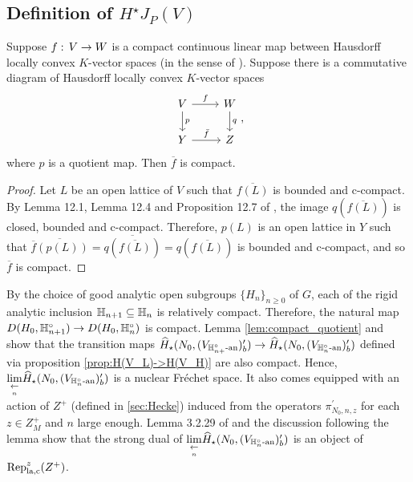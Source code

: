 \documentclass[10pt]{amsart}
\begin{document}
\subsection{Definition of $H^{\star}J_{P}(V)$}\label{sec:def}

\begin{lemma}\label{lem:compact_quotient}
Suppose $f:\,V\rightarrow W$ is a compact continuous linear map between Hausdorff locally convex $K$-vector spaces (in the sense of \cite[]{Schneider_nfs}). Suppose there is a commutative diagram of Hausdorff locally convex $K$-vector spaces \begin{equation*}
    \begin{tikzcd}
	V \arrow[r,"f"] \arrow[d,"p"] & W \arrow[d,"q"] \\
	Y \arrow[r,"\bar{f}"] & Z
    \end{tikzcd},
\end{equation*} where $p$ is a quotient map. Then $\overline{f}$ is compact.
\end{lemma}
\begin{proof}
Let $L$ be an open lattice of $V$ such that $\overline{f(L)}$ is bounded and c-compact. By Lemma 12.1, Lemma 12.4 and Proposition 12.7 of \cite{Schneider_nfs}, the image $q\left(\overline{f(L)}\right)$ is closed, bounded and c-compact. Therefore, $p(L)$ is an open lattice in $Y$ such that $\overline{\overline{f}\left(p(L)\right)} = \overline{q\left(\overline{f(L)}\right)}=q\left(\overline{f(L)}\right)$ is bounded and c-compact, and so $\overline{f}$ is compact.
\end{proof}

By the choice of good analytic open subgroups $\{H_{n}\}_{n\geq0}$ of $G$, each of the rigid analytic inclusion $\mathbb{H}_{n+1}\subseteq \mathbb{H}_{n}$ is relatively compact. Therefore, the natural map $D(H_{0},\mathbb{H}_{n+1}^{\circ})\rightarrow D(H_{0},\mathbb{H}_{n}^{\circ})$ is compact. Lemma \ref{lem:compact_quotient} and \cite[Rem. 16.7]{Schneider_nfs} show that the transition maps $\widehat{H}_{\star}(N_{0},(V_{\mathbb{H}_{n+}^{\circ}\textnormal{-an}})^{\prime}_{b}) \rightarrow \widehat{H}_{\star}(N_{0},(V_{\mathbb{H}_{n}^{\circ}\textnormal{-an}})^{\prime}_{b})$ defined via proposition \ref{prop:H(V_L)->H(V_H)} are also compact. Hence, $\underset{\underset{n}{\leftarrow}}{\lim}\widehat{H}_{\star}(N_{0},(V_{\mathbb{H}_{n}^{\circ}\textnormal{-an}})^{\prime}_{b})$ is a nuclear Fr\'echet space. It also comes equipped with an action of $Z^{+}$ (defined in \textsection \ref{sec:Hecke}) induced from the operators $\pi_{N_{0},n,z}^{\prime}$ for each $z\in Z_{M}^{+}$ and $n$ large enough. Lemma 3.2.29 of \cite{Jacquet1} and the discussion following the lemma show that the strong dual of $\underset{\underset{n}{\leftarrow}}{\lim}\widehat{H}_{\star}(N_{0},(V_{\mathbb{H}_{n}^{\circ}\textnormal{-an}})^{\prime}_{b})$ is an object of $\textnormal{Rep}_{\textnormal{la,c}}^{z}(Z^{+})$. 
\end{document}
